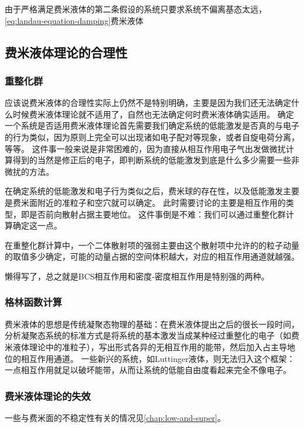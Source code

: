 由于严格满足费米液体的第二条假设的系统只要求系统不偏离基态太远，\eqref{eq:landau-equation-damping}费米液体

\subsection{费米液体理论的合理性}

\subsubsection{重整化群}

应该说费米液体的合理性实际上仍然不是特别明确，主要是因为我们还无法确定什么时候费米液体理论就不适用了，自然也无法确定何时费米液体确实适用。
确定一个系统是否适用费米液体理论首先需要我们确定系统的低能激发是否真的与电子的行为类似，因为原则上完全可以出现诸如电子配对等现象，或者自旋电荷分离，等等。
这件事一般来说是非常困难的，因为直接从相互作用电子气出发做微扰计算得到的当然是修正后的电子，即判断系统的低能激发到底是什么多少需要一些非微扰的方法。

在确定系统的低能激发和电子行为类似之后，费米球的存在性，以及低能激发主要是费米面附近的准粒子和空穴就可以确定。
此时需要讨论的主要是相互作用的类型，即是否前向散射占据主要地位。
这件事倒是不难：我们可以通过重整化群计算确定这一点。

在重整化群计算中，一个二体散射项的强弱主要由这个散射项中允许的的粒子动量的取值多少确定，可能的动量占据的空间体积越大，对应的相互作用通道就越强。

懒得写了，总之就是BCS相互作用和密度-密度相互作用是特别强的两种。

\subsubsection{格林函数计算}

费米液体的思想是传统凝聚态物理的基础：在费米液体提出之后的很长一段时间，分析凝聚态系统的标准方式是将系统的基本激发当成某种经过重整化的电子（如费米液体理论中的准粒子），写出形式各异的无相互作用的能带，然后加入占主导地位的相互作用通道。
一些新兴的系统，如Luttinger液体，则无法归入这个框架：一点相互作用就足以破坏能带，从而让系统的低能自由度看起来完全不像电子。

\subsubsection{费米液体理论的失效}

一些与费米面的不稳定性有关的情况见\autoref{chap:low-and-super}。